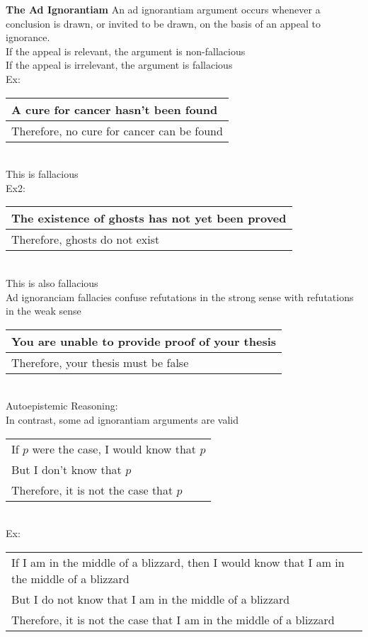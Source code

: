 \textbf{The Ad Ignorantiam}
An ad ignorantiam argument occurs whenever a conclusion is drawn, or invited to be drawn, on the basis of an appeal to ignorance.\\
If the appeal is relevant, the argument is non-fallacious\\
If the appeal is irrelevant, the argument is fallacious\\

Ex:\\
\begin{tabular}{p{8cm}}
    A cure for cancer hasn't been found\\
    \hline
    Therefore, no cure for cancer can be found
\end{tabular}\\
This is fallacious\\
Ex2:\\
\begin{tabular}{p{8cm}}
    The existence of ghosts has not yet been proved\\
    \hline
    Therefore, ghosts do not exist
\end{tabular}\\
This is also fallacious\\

Ad ignoranciam fallacies confuse refutations in the strong sense with refutations in the weak sense\\
\begin{tabular}{p{8cm}}
    You are unable to provide proof of your thesis\\
    \hline
    Therefore, your thesis must be false
\end{tabular}\\

Autoepistemic Reasoning:\\
In contrast, some ad ignorantiam arguments are valid\\
\begin{tabular}{p{8cm}}
    If $p$ were the case, I would know that $p$\\
    But I don't know that $p$\\
    \hline
    Therefore, it is not the case that $p$
\end{tabular}\\
Ex:\\
\begin{tabular}{p{16cm}}
    If I am in the middle of a blizzard, then I would know that I am in the middle of a blizzard\\
    But I do not know that I am in the middle of a blizzard\\
    \hline
    Therefore, it is not the case that I am in the middle of a blizzard
\end{tabular}\\

